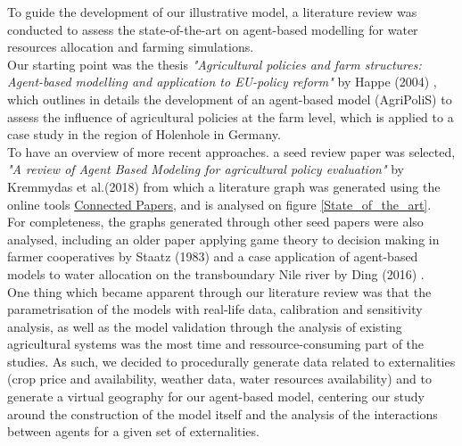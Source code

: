 \documentclass[a4paper,12pt]{article} %
\begin{document}
To guide the development of our illustrative model, a literature review was conducted to assess the state-of-the-art on agent-based modelling for water resources allocation and farming simulations. \\
Our starting point was the thesis \textit{"Agricultural policies and farm structures: Agent-based modelling and application to EU-policy reform"} by Happe (2004) \cite{happeAgriculturalPoliciesFarm2004}, which outlines in details the development of an agent-based model (AgriPoliS) to assess the influence of agricultural policies at the farm level, which is applied to a case study in the region of Holenhole in Germany.\\
To have an overview of more recent approaches. a seed review paper was selected, \textit{"A review of Agent Based Modeling for agricultural policy evaluation"} by Kremmydas et al.(2018) \cite{kremmydasReviewAgentBased2018} from which a literature graph was generated using the online tools \href{https://www.connectedpapers.com/main/35fac7b643317e5f48f5280fadec94051bf2401f/A-review-of-Agent-Based-Modeling-for-agricultural-policy-evaluation/graph}{Connected Papers}, and is analysed on figure \ref{State_of_the_art}.\\
For completeness, the graphs generated through other seed papers were also analysed, including an older paper applying game theory to decision making in farmer cooperatives by Staatz (1983) \cite{staatzGametheoreticAnalysisDecision1983} and a case application of agent-based models to water allocation on the transboundary Nile river by Ding (2016) \cite{dingAgentBasedModelling2016}.\\
One thing which became apparent through our literature review was that the parametrisation of the models with real-life data, calibration and sensitivity analysis, as well as the model validation through the analysis of existing agricultural systems was the most time and ressource-consuming part of the studies. As such, we decided to procedurally generate data related to externalities (crop price and availability, weather data, water resources availability) and to generate a virtual geography for our agent-based model, centering our study around the construction of the model itself and the analysis of the interactions between agents for a given set of externalities.
\end{document}
